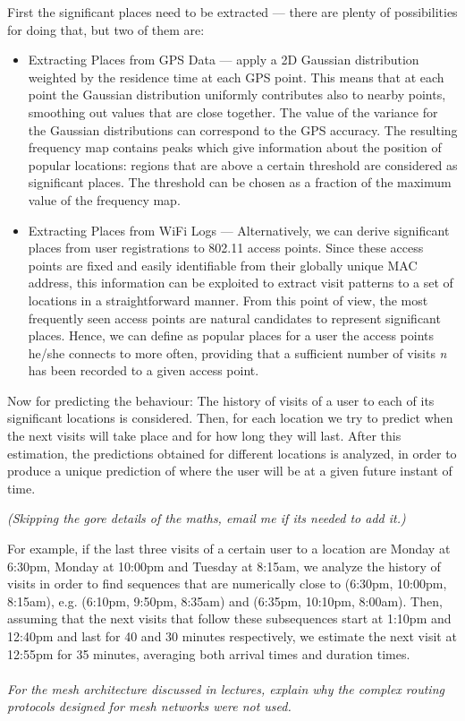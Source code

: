 \documentclass[12pt]{article}
\newcommand*\circled[1]{\tikz[baseline=(char.base)]{
		\node[shape=circle,draw,inner sep=0pt] (char) {#1};}}
\begin{document}
First the significant places need to be extracted --- there are plenty of
possibilities for doing that, but two of them are:
\begin{itemize}
    \item Extracting Places from GPS Data --- apply a 2D Gaussian distribution
        weighted by the residence time at each GPS point. This means that at
        each point the Gaussian distribution uniformly contributes also to
        nearby points, smoothing out values that are close together.  The
        value of  the  variance  for  the  Gaussian  distributions  can
        correspond to the GPS accuracy.  The resulting frequency map contains
        peaks which give information about the position of popular locations:
        regions that are above a certain threshold are considered as
        significant places. The threshold can be chosen as a fraction of the
        maximum value of the frequency map.
    \item Extracting  Places  from  WiFi  Logs --- Alternatively,  we  can
        derive  significant  places from user registrations to 802.11 access
        points. Since these access points are fixed and easily identifiable from
        their globally unique MAC address, this information can be exploited
        to extract visit patterns to a set of locations in a straightforward
        manner. From this point of view, the most frequently seen access points
        are natural candidates to represent significant places. Hence, we can
        define as popular places for a user the access points he/she connects to
        more often, providing that a sufficient number of visits \textit{n} has been
        recorded to a given access point.
\end{itemize}

Now for predicting the behaviour: The history of visits of a user to each of
its significant locations is considered. Then, for each location we try to
predict when the next visits will take place and for how long they will last.
After this estimation, the predictions obtained for different locations is
analyzed, in order to produce a unique prediction of where the user will be at
a given future instant of time. 

\textit{(Skipping the gore details of the maths, email me if its needed to add it.)}

For example, if the last three visits of a certain user to a location are Monday
at 6:30pm, Monday at 10:00pm and Tuesday at 8:15am, we analyze the history of
visits in order to find sequences that are numerically close to (6:30pm,
10:00pm, 8:15am), e.g. (6:10pm, 9:50pm, 8:35am) and (6:35pm, 10:10pm, 8:00am).
Then, assuming that the next visits that follow these subsequences start at
1:10pm and 12:40pm and last for 40 and 30 minutes respectively, we estimate the
next visit at 12:55pm for 35 minutes, averaging both arrival times and duration
times.
\\
\\
\textit{\circled{4.} For the mesh architecture discussed in lectures, explain
why the complex routing protocols designed for mesh networks were not used.}
\end{document}
